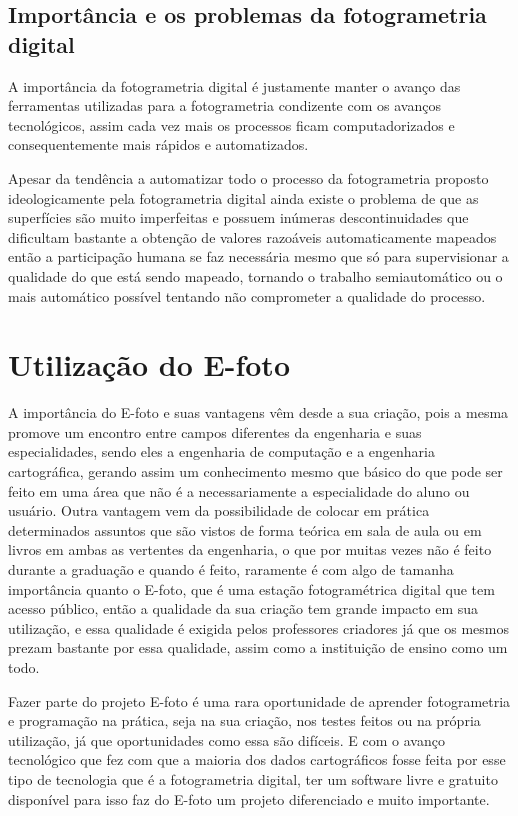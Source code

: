 \subsection{Importância e os problemas da fotogrametria digital}
A importância da fotogrametria digital é justamente manter o avanço das ferramentas utilizadas para a fotogrametria condizente com os avanços tecnológicos, assim cada vez mais os processos ficam computadorizados e consequentemente mais rápidos e automatizados.

Apesar da tendência a automatizar todo o processo da fotogrametria proposto ideologicamente pela fotogrametria digital ainda existe o problema de que as superfícies são muito imperfeitas e possuem inúmeras descontinuidades que dificultam bastante a obtenção de valores razoáveis automaticamente mapeados então a participação humana se faz necessária mesmo que só para supervisionar a qualidade do que está sendo mapeado, tornando o trabalho semiautomático ou o mais automático possível tentando não comprometer a qualidade do processo.


\section{Utilização do E-foto}

A importância do E-foto e suas vantagens vêm desde a sua criação, pois a mesma promove um encontro entre campos diferentes da engenharia e suas especialidades, sendo eles a engenharia de computação e a engenharia cartográfica, gerando assim um conhecimento mesmo que básico do que pode ser feito em uma área que não é a necessariamente a especialidade do aluno ou usuário. Outra vantagem vem da possibilidade de colocar em prática determinados assuntos que são vistos de forma teórica em sala de aula ou em livros em ambas as vertentes da engenharia, o que por muitas vezes não é feito durante a graduação e quando é feito, raramente é com algo de tamanha importância quanto o E-foto, que é uma estação fotogramétrica digital que tem acesso público, então a qualidade da sua criação tem grande impacto em sua utilização, e essa qualidade é exigida pelos professores criadores já que os mesmos prezam bastante por essa qualidade, assim como a instituição de ensino como um todo.

Fazer parte do projeto E-foto é uma rara oportunidade de aprender fotogrametria e programação na prática, seja na sua criação, nos testes feitos ou na própria utilização, já que oportunidades como essa são difíceis. E com o avanço tecnológico que fez com que a maioria dos dados cartográficos fosse feita por esse tipo de tecnologia que é a fotogrametria digital, ter um software livre e gratuito disponível para isso faz do E-foto um projeto diferenciado e muito importante.


